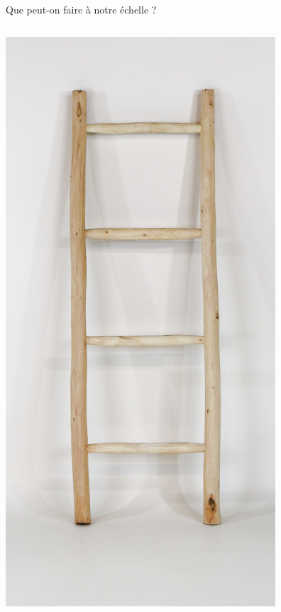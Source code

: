 \documentclass[10pt,table,dvipsnames,compress]{beamer}
\begin{document}
\begin{frame}[label={sec:org05f8e72}]{Que peut-on faire à notre échelle ?}
\begin{columns}
\begin{column}{0.3\columnwidth}
\begin{center}
\includegraphics[width=\textwidth]{figs/echelle.jpg}
\end{center}
\end{column}
\end{columns}
\end{frame}
\end{document}
